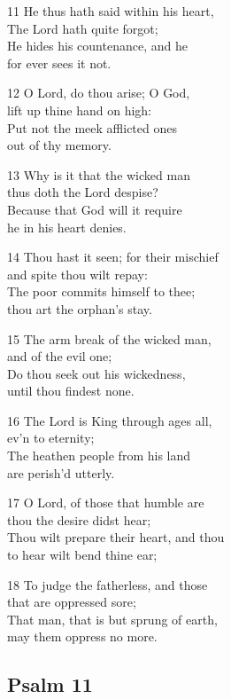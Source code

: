 \begin{multicols}{3}
11 He thus hath said within his heart,\\
The Lord hath quite forgot;\\
He hides his countenance, and he\\
for ever sees it not.

12 O Lord, do thou arise; O God,\\
lift up thine hand on high:\\
Put not the meek afflicted ones\\
out of thy memory.

13 Why is it that the wicked man\\
thus doth the Lord despise?\\
Because that God will it require\\
he in his heart denies.

14 Thou hast it seen; for their mischief\\
and spite thou wilt repay:\\
The poor commits himself to thee;\\
thou art the orphan’s stay.

15 The arm break of the wicked man,\\
and of the evil one;\\
Do thou seek out his wickedness,\\
until thou findest none.

16 The Lord is King through ages all,\\
ev’n to eternity;\\
The heathen people from his land\\
are perish’d utterly.

17 O Lord, of those that humble are\\
thou the desire didst hear;\\
Thou wilt prepare their heart, and thou\\
to hear wilt bend thine ear;

18 To judge the fatherless, and those\\
that are oppressed sore;\\
That man, that is but sprung of earth,\\
may them oppress no more.


\begin{center}
\quad{}\quad{}
\end{center}

\subsection*{Psalm 11 }


\end{multicols}
